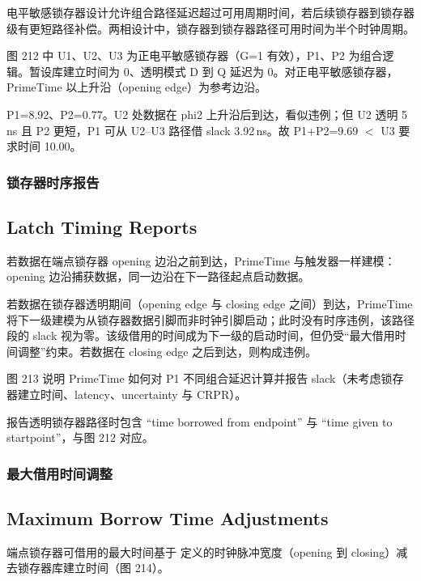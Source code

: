 电平敏感锁存器设计允许组合路径延迟超过可用周期时间，若后续锁存器到锁存器级有更短路径补偿。两相设计中，锁存器到锁存器路径可用时间为半个时钟周期。

图 212 中 U1、U2、U3 为正电平敏感锁存器（G=1 有效），P1、P2 为组合逻辑。暂设库建立时间为 0、透明模式 D 到 Q 延迟为 0。对正电平敏感锁存器，PrimeTime 以上升沿（opening edge）为参考边沿。

P1=8.92、P2=0.77。U2 处数据在 phi2 上升沿后到达，看似违例；但 U2 透明 5\,ns 且 P2 更短，P1 可从 U2--U3 路径借 slack 3.92\,ns。故 P1+P2=9.69 $<$ U3 要求时间 10.00。

\subsubsection{锁存器时序报告}
\subsection*{Latch Timing Reports}

若数据在端点锁存器 opening 边沿之前到达，PrimeTime 与触发器一样建模：opening 边沿捕获数据，同一边沿在下一路径起点启动数据。

若数据在锁存器透明期间（opening edge 与 closing edge 之间）到达，PrimeTime 将下一级建模为从锁存器数据引脚而非时钟引脚启动；此时没有时序违例，该路径段的 slack 视为零。该级借用的时间成为下一级的启动时间，但仍受“最大借用时间调整”约束。若数据在 closing edge 之后到达，则构成违例。


图 213 说明 PrimeTime 如何对 P1 不同组合延迟计算并报告 slack（未考虑锁存器建立时间、latency、uncertainty 与 CRPR）。

 报告透明锁存器路径时包含 “time borrowed from endpoint” 与 “time given to startpoint”，与图 212 对应。

\subsubsection{最大借用时间调整}
\subsection*{Maximum Borrow Time Adjustments}

端点锁存器可借用的最大时间基于  定义的时钟脉冲宽度（opening 到 closing）减去锁存器库建立时间（图 214）。

